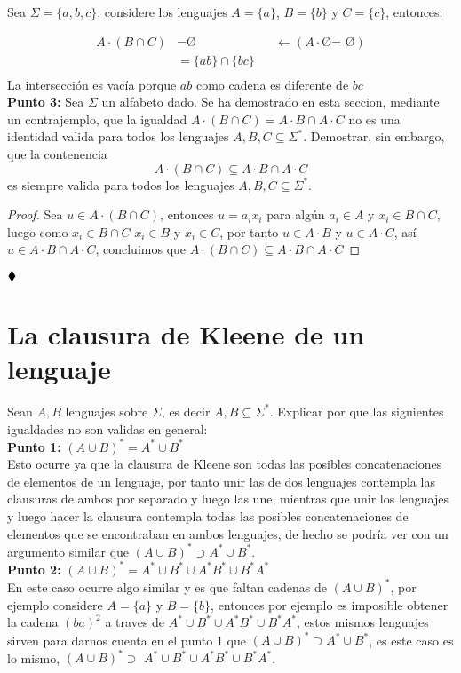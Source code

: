  Sea $\displaystyle\Sigma=\{a,b,c\}$, considere los lenguajes $A=\{a\}$, $B=\{b\}$ y $C=\{c\}$, entonces:

\begin{align*}
    A\cdot(B\cap C)&=\text{\O}  &&\longleftarrow(A\cdot \text{\O = \O})\\
    &=\{ab\}\cap\{bc\}\\
\end{align*}
La intersección es vacía porque $ab$ como cadena es diferente de $bc$\\

\textbf{Punto 3: }Sea $\Sigma$ un alfabeto dado. Se ha demostrado en esta seccion, mediante un contrajemplo, que la igualdad  $A\cdot(B\cap C)=A\cdot B\cap A\cdot C$ no es una identidad valida para todos los lenguajes $A,B,C\subseteq \Sigma^*.$ Demostrar, sin embargo, que la contenencia
$$A\cdot(B\cap C)\subseteq A\cdot B\cap A\cdot C$$
es siempre valida para todos los lenguajes $A,B,C\subseteq \Sigma^*.$

\begin{proof}
Sea $u\in A\cdot(B\cap C)$, entonces $u=a_ix_i$ para algún $a_i\in A$ y $x_i \in B\cap C$, luego como $x_i\in B\cap C$ $x_i\in B$ y $x_i \in C$, por tanto $u \in A\cdot B$ y $u\in A\cdot C$, así $u\in A\cdot B \cap A\cdot C$, concluimos que $A \cdot(B \cap C) \subseteq A \cdot B \cap A \cdot C$

\end{proof}


$\hfill \blacklozenge$

\section{La clausura de Kleene de un lenguaje}
Sean $A,B$ lenguajes sobre $\Sigma$, es decir $A,B\subseteq\Sigma^*.$ Explicar por que las siguientes igualdades no son validas en general:\\
\textbf{Punto 1: } $(A\cup B)^*=A^*\cup B^*$\\ 
Esto ocurre ya que la clausura de Kleene son todas las posibles concatenaciones de elementos de un lenguaje, por tanto unir las de dos lenguajes contempla las clausuras de ambos por separado y luego las une, mientras que unir los lenguajes y luego hacer la clausura contempla todas las posibles concatenaciones de elementos que se encontraban en ambos lenguajes, de hecho se podría ver con un argumento similar que $(A\cup B)^*\supset A^* \cup B^*$.\\


\textbf{Punto 2: } $(A\cup B)^*=A^*\cup B^*\cup A^*B^*\cup B^*A^*$ \\
 En este caso ocurre algo similar y es que faltan cadenas de $(A \cup B)^*$, por ejemplo considere $A=\{a\}$ y $B=\{b\}$, entonces por ejemplo es imposible obtener la cadena $(ba)^2$ a traves de $A^* \cup B^* \cup A^* B^* \cup B^* A^*$, estos mismos lenguajes sirven para darnos cuenta en el punto 1 que $(A \cup B)^*\supset A^*\cup B^*$, es este caso es lo mismo, $(A \cup B)^* \supset$ $A^* \cup B^* \cup A^* B^* \cup B^* A^*$.\\

